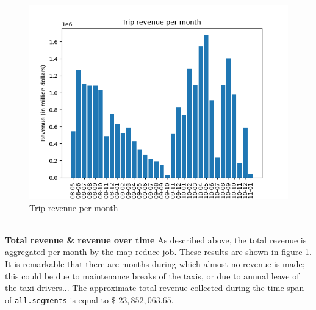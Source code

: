\documentclass[11pt]{article}
\begin{document}
\begin{figure}
	\vspace{-1cm}
	\includegraphics[width=1.2\linewidth]{./img/revenuePerMonth.png}
	\caption{Trip revenue per month}
	\label{fig:revenue}
\end{figure}

\noindent\\\textbf{Total revenue \& revenue over time}
As described above, the total revenue is aggregated per month by the map-reduce-job. These results are shown in figure \ref{fig:revenue}. It is remarkable that there are months during which almost no revenue is made; this could be due to maintenance breaks of the taxis, or due to annual leave of the taxi drivers... The approximate total revenue collected during the time-span of \texttt{all.segments} is equal to \$ $23,852,063.65$.

\vspace{-.2cm}


\end{document}
